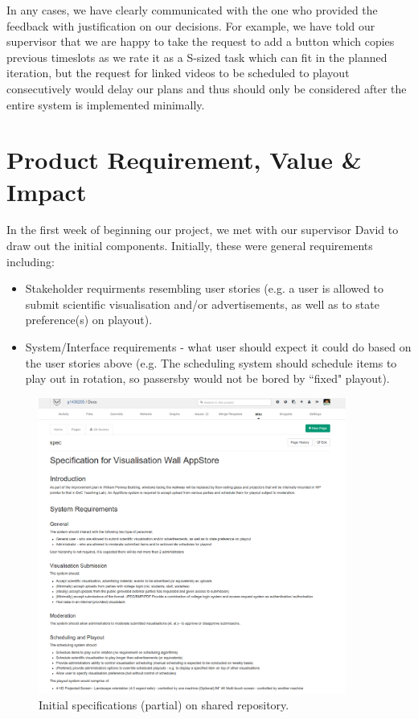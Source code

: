 \documentclass[a4paper]{article}
\begin{document}
In any cases, we have clearly communicated with the one who provided the
feedback with justification on our decisions. For example, we have told
our supervisor that we are happy
to take the request to add a button which copies
previous timeslots as we rate it as a S-sized task which can fit in the
planned iteration, but the request for linked videos to be scheduled to 
playout consecutively would delay our plans and thus should only be considered
after the entire system is implemented minimally.


\section{Product Requirement, Value \& Impact}
In the first week of beginning our project, we met with our supervisor 
David to draw out the initial components. Initially, these were general
requirements including:

\begin{itemize}
  \item Stakeholder requirments resembling user stories (e.g.
        a user is allowed to submit scientific visualisation and/or 
        advertisements, as well as to state preference(s) on playout).
  \item System/Interface requirements - what user should expect it could do
        based on the user stories above (e.g. The scheduling system should
        schedule items to play out in rotation, so passersby would not be
        bored by ``fixed" playout).

\end{itemize}

\begin{figure}[H]
  \centering
    \includegraphics[width = 0.9\textwidth, trim = 0 15cm 0 5cm, clip]{./evaluation/specs.png}

  \caption{Initial specifications (partial) on shared repository.}
  \label{fig:specs}
\end{figure}
\end{document}
